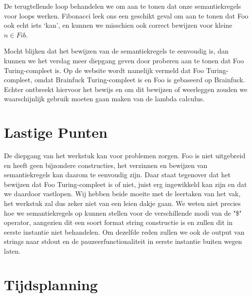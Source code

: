 \documentclass[11pt]{article}
\begin{document}
De terugtellende loop behandelen we om aan te tonen dat onze semantiekregels voor loops werken.
Fibonacci leek ons een geschikt geval om aan te tonen dat Foo ook echt iets `kan', en kunnen we misschien ook correct bewijzen voor kleine \(n \in Fib\).

Mocht blijken dat het bewijzen van de semantiekregels te eenvoudig is, dan kunnen we het verslag meer diepgang geven door proberen aan te tonen dat Foo Turing-compleet is.
Op de website wordt namelijk vermeld dat Foo Turing-compleet, omdat Brainfuck Turing-compleet is en Foo is gebaseerd op Brainfuck. 
Echter ontbreekt hiervoor het bewijs en om dit bewijzen of weerleggen zouden we waarschijnlijk gebruik moeten gaan maken van de lambda calculus.


\section{Lastige Punten}

De diepgang van het werkstuk kan voor problemen zorgen. 
Foo is niet uitgebreid en heeft geen bijzondere constructies, het verzinnen en bewijzen van semantiekregels kan daarom te eenvoudig zijn. 
Daar staat tegenover dat het bewijzen dat Foo Turing-compleet is of niet, juist erg ingewikkeld kan zijn en dat we daardoor vastlopen.
\newline
Wij hebben beide moeite met de leertaken van het vak, het werkstuk zal dus zeker niet van een leien dakje gaan.
\newline
We weten niet precies hoe we semantiekregels op kunnen stellen voor de verschillende modi van de "\$" operator, aangezien dit een soort format string constructie is en zullen dit in eerste instantie niet behandelen. %
Om dezelfde reden zullen we ook de output van strings naar stdout en de pauzeerfunctionaliteit in eerste instantie buiten wegen laten.

\section{Tijdsplanning}


%
\end{document}
